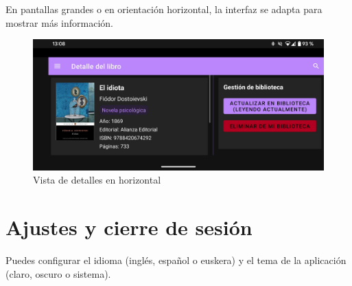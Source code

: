 \documentclass[a4paper,12pt]{report}
\begin{document}
\begin{multicols}{2}
        En pantallas grandes o en orientación horizontal, la interfaz se adapta para mostrar más información.
        
        \begin{figure}[H]
          \centering
          \includegraphics[width=0.95\linewidth]{.img/libro-land.png}
          \caption{Vista de detalles en horizontal}
        \end{figure}
        \vspace{-0.8em}  %
        
        \section{Ajustes y cierre de sesión}
        \vspace{-0.8em}  %
        Puedes configurar el idioma (inglés, español o euskera) y el tema de la aplicación (claro, oscuro o sistema).
        

\end{multicols}
\end{document}
